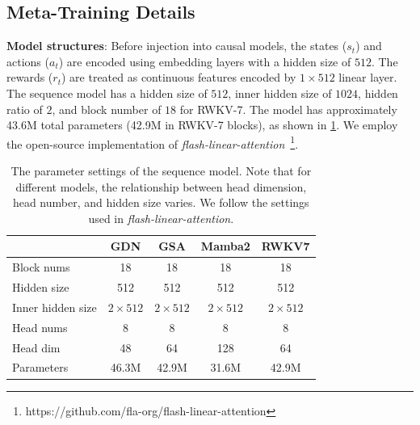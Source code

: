 \documentclass{article}
\begin{document}
\subsection{Meta-Training Details} \label{sec:training_settings}
\textbf{Model structures}: Before injection into causal models, the states ($s_t$) and actions ($a_t$) are encoded using embedding layers with a hidden size of $512$. The rewards ($r_t$) are treated as continuous features encoded by $1\times512$ linear layer. The sequence model has a hidden size of $512$, inner hidden size of $1024$, hidden ratio of $2$, and block number of $18$ for RWKV-7. The model has approximately 43.6M total parameters (42.9M in RWKV-7 blocks), as shown in \cref{tab:architectures_params}. We employ the open-source implementation of \emph{flash-linear-attention}~\footnote{https://github.com/fla-org/flash-linear-attention}.
\begin{table}[htbp]
    \centering
    \caption{The parameter settings of the sequence model. Note that for different models, the relationship between head dimension, head number, and hidden size varies. We follow the settings used in \emph{flash-linear-attention}.}
    \begin{tabular}{lcccc}
        \toprule
        & GDN & GSA & Mamba2 & RWKV7 \\
        \midrule
        Block nums & 18 & 18 & 18 & 18 \\
        Hidden size & 512 & 512 & 512 & 512 \\
        Inner hidden size & $2\times512$ & $2\times512$ & $2\times512$ & $2\times512$ \\
        Head nums & 8 & 8 & 8 & 8 \\
        Head dim & 48 & 64 & 128 & 64 \\
        Parameters & 46.3M & 42.9M & 31.6M & 42.9M \\
        \bottomrule
    \end{tabular}
    \label{tab:architectures_params}
\end{table}
\end{document}
